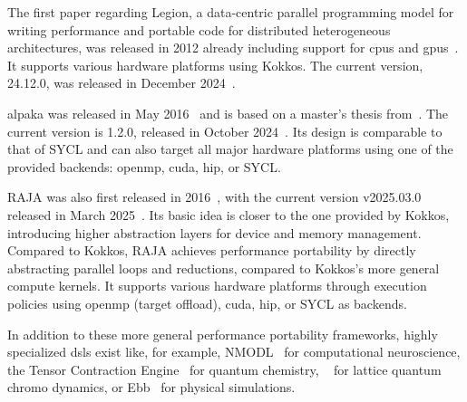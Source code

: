 The first paper regarding Legion, a data-centric parallel programming model for writing performance and portable code for distributed heterogeneous architectures, was released in 2012 already including support for \glspl{cpu} and \glspl{gpu}~\cite{bauer_legion_2012}. 
It supports various hardware platforms using Kokkos. 
The current version, 24.12.0, was released in December 2024~\cite{stanford_release_2024}.

\gls{alpaka} was released in May 2016~\cite{zenker_alpaka_2016, alpaka-group_release_2016} and is based on a master's thesis from~\citet{worpitz_investigating_2015}. 
The current version is 1.2.0, released in October 2024~\cite{alpaka-group_release_2024}. 
Its design is comparable to that of SYCL and can also target all major hardware platforms using one of the provided backends: \gls{openmp}, \gls{cuda}, \gls{hip}, or SYCL. 

RAJA was also first released in 2016~\cite{llnl_release_2016}, with the current version v2025.03.0 released in March 2025~\cite{llnl_release_2025}. 
Its basic idea is closer to the one provided by Kokkos, introducing higher abstraction layers for device and memory management. 
Compared to Kokkos, RAJA achieves performance portability by directly abstracting parallel loops and reductions, compared to Kokkos's more general compute kernels. 
It supports various hardware platforms through execution policies using \gls{openmp} (target offload), \gls{cuda}, \gls{hip}, or SYCL as backends. 

In addition to these more general performance portability frameworks, highly specialized \glspl{dsl} exist like, for example, NMODL~\cite{hines_expanding_2000} for computational neuroscience, the Tensor Contraction Engine~\cite{baumgartner_synthesis_2005} for quantum chemistry, \qdppp~\cite{edwards_chroma_2005} for lattice quantum chromo dynamics, or Ebb~\cite{bernstein_ebb_2016} for physical simulations. 
